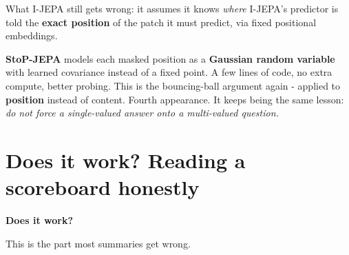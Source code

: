 \documentclass[aspectratio=169]{beamer}
\begin{document}
\begin{frame}{What I-JEPA still gets wrong: it assumes it knows \emph{where}}
  \small
  I-JEPA's predictor is told the \textbf{exact position} of the patch it must predict, via
  fixed positional embeddings.
  \vskip 10pt
  \begin{center}
  \end{center}
  \vskip 10pt
  \textbf{StoP-JEPA} models each masked position as a \textbf{Gaussian random variable}
  with learned covariance instead of a fixed point. A few lines of code, no extra compute,
  better probing.
  \vskip 8pt
  \footnotesize
  \color{armred}This is the bouncing-ball argument again - applied to \textbf{position}
  instead of content. Fourth appearance. It keeps being the same lesson: \emph{do not
  force a single-valued answer onto a multi-valued question.}
\end{frame}

\section{Does it work? Reading a scoreboard honestly}

\begin{frame}[plain]
  \vfill
  \begin{center}
    {\Large\color{popblue}\textbf{Does it work?}}\\[0.9em]
    \begin{minipage}{0.82\textwidth}\centering\small
      This is the part most summaries get wrong.
    \end{minipage}
  \end{center}
  \vfill
\end{frame}
\end{document}
